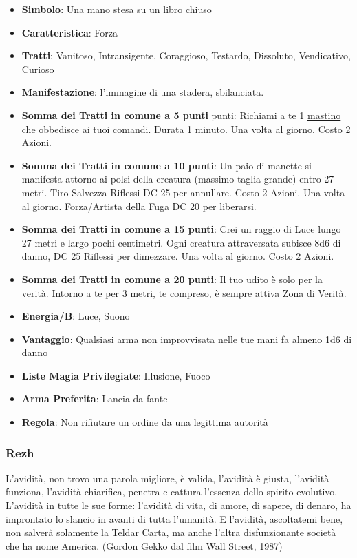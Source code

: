 \begin{multicols}{2}
\begin{itemize}[leftmargin=*] \setlength{\itemsep}{0pt}
\item \textbf{Simbolo}: Una mano stesa su un libro chiuso
\item \textbf{Caratteristica}: Forza
\item \textbf{Tratti}: Vanitoso, Intransigente, Coraggioso, Testardo, Dissoluto, Vendicativo, Curioso
\item \textbf{Manifestazione}: l'immagine di una stadera, sbilanciata.
\item \textbf{Somma dei Tratti in comune a 5 punti} punti: Richiami a te 1 \hyperlink{Mastino}{mastino} che obbedisce ai tuoi comandi. Durata 1 minuto. Una volta al giorno. Costo 2 Azioni.
\item \textbf{Somma dei Tratti in comune a 10 punti}: Un paio di manette si manifesta attorno ai polsi della creatura (massimo taglia grande) entro 27 metri. Tiro Salvezza Riflessi DC 25 per annullare. Costo 2 Azioni. Una volta al giorno. Forza/Artista della Fuga DC 20 per liberarsi.
\item \textbf{Somma dei Tratti in comune a 15 punti}: Crei un raggio di Luce lungo 27 metri e largo pochi centimetri. Ogni creatura attraversata subisce 8d6 di danno, DC 25 Riflessi per dimezzare. Una volta al giorno. Costo 2 Azioni.
\item \textbf{Somma dei Tratti in comune a 20 punti}: Il tuo udito è solo per la verità. Intorno a te per 3 metri, te compreso, è sempre attiva \hyperlink{Zona di Verità}{Zona di Verità}.
\item \textbf{Energia/B}: Luce, Suono
\item \textbf{Vantaggio}: Qualsiasi arma non improvvisata nelle tue mani fa almeno 1d6 di danno
\item \textbf{Liste Magia Privilegiate}: Illusione, Fuoco
\item \textbf{Arma Preferita}: Lancia da fante
\item \textbf{Regola}: Non rifiutare un ordine da una legittima autorità
\end{itemize}

\subsubsection{Rezh}\label{rezh}\hypertarget{rezh}{}

\begin{changemargin}{0.3cm}{0.3cm}\begin{enfasi}{
L'avidità, non trovo una parola migliore, è valida, l'avidità è giusta, l'avidità funziona, l'avidità chiarifica, penetra e cattura l'essenza dello spirito evolutivo. L'avidità in tutte le sue forme: l'avidità di vita, di amore, di sapere, di denaro, ha improntato lo slancio in avanti di tutta l'umanità. E l'avidità, ascoltatemi bene, non salverà solamente la Teldar Carta, ma anche l'altra disfunzionante società che ha nome America. (Gordon Gekko dal film Wall Street, 1987)
}\end{enfasi}\end{changemargin}\medskip


\end{multicols}
